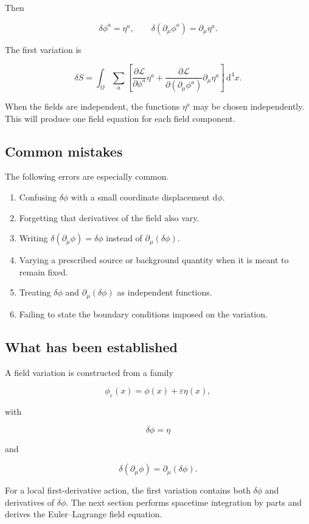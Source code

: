 Then

\[
\delta\phi^{a}=\eta^{a},
\qquad
\delta(\partial_{\mu}\phi^{a})
=
\partial_{\mu}\eta^{a}.
\]

The first variation is

\[
\delta S
=
\int_{\Omega}
\sum_{a}
\left[
\frac{\partial\mathcal{L}}{\partial\phi^{a}}
\eta^{a}
+
\frac{\partial\mathcal{L}}
{\partial(\partial_{\mu}\phi^{a})}
\partial_{\mu}\eta^{a}
\right]
\,\mathrm{d}^{4}x.
\]

When the fields are independent, the functions \(\eta^{a}\) may be chosen independently. This will produce one field equation for each field component.

\subsection{Common mistakes}

The following errors are especially common.

\begin{enumerate}
    \item Confusing \(\delta\phi\) with a small coordinate displacement \(\mathrm{d}\phi\).
    \item Forgetting that derivatives of the field also vary.
    \item Writing \(\delta(\partial_{\mu}\phi)=\delta\phi\) instead of \(\partial_{\mu}(\delta\phi)\).
    \item Varying a prescribed source or background quantity when it is meant to remain fixed.
    \item Treating \(\delta\phi\) and \(\partial_{\mu}(\delta\phi)\) as independent functions.
    \item Failing to state the boundary conditions imposed on the variation.
\end{enumerate}

\subsection{What has been established}

A field variation is constructed from a family

\[
\phi_{\varepsilon}(x)
=
\phi(x)+\varepsilon\eta(x),
\]

with

\[
\delta\phi=\eta
\]

and

\[
\delta(\partial_{\mu}\phi)
=
\partial_{\mu}(\delta\phi).
\]

For a local first-derivative action, the first variation contains both \(\delta\phi\) and derivatives of \(\delta\phi\). The next section performs spacetime integration by parts and derives the Euler--Lagrange field equation.